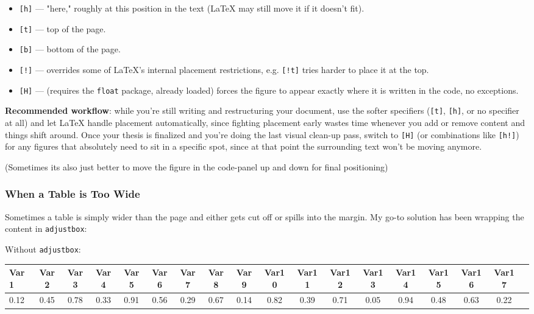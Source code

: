 \begin{itemize}
    \item \texttt{[h]} --- "here," roughly at this position in the text (LaTeX may still move it if it doesn't fit).
    \item \texttt{[t]} --- top of the page.
    \item \texttt{[b]} --- bottom of the page.
    \item \texttt{[!]} --- overrides some of LaTeX's internal placement restrictions, e.g. \texttt{[!t]} tries harder to place it at the top.
    \item \texttt{[H]} --- (requires the \texttt{float} package, already loaded) forces the figure to appear exactly where it is written in the code, no exceptions.
\end{itemize}

\textbf{Recommended workflow}: while you're still writing and restructuring your document, use the softer specifiers (\texttt{[t]}, \texttt{[h]}, or no specifier at all) and let LaTeX handle placement automatically, since fighting placement early wastes time whenever you add or remove content and things shift around. Once your thesis is finalized and you're doing the last visual clean-up pass, switch to \texttt{[H]} (or combinations like \texttt{[h!]}) for any figures that absolutely need to sit in a specific spot, since at that point the surrounding text won't be moving anymore.

(Sometimes its also just better to move the figure in the code-panel up and down for final positioning)

\subsubsection*{When a Table is Too Wide}
Sometimes a table is simply wider than the page and either gets cut off or spills into the margin. My go-to solution has been wrapping the content in \texttt{adjustbox}:

Without \texttt{adjustbox}: 

\begin{table}[H]
\centering
\begin{tabular}{lccccccccccccccccc}
    \toprule
    Var1 & Var2 & Var3 & Var4 & Var5 & Var6 & Var7 & Var8 & Var9 & Var10 & Var11 & Var12 & Var13 & Var14 & Var15 & Var16 & Var17 \\
    \midrule
    0.12 & 0.45 & 0.78 & 0.33 & 0.91 & 0.56 & 0.29 & 0.67 & 0.14 & 0.82 & 0.39 & 0.71 & 0.05 & 0.94 & 0.48 & 0.63 & 0.22 \\
    \bottomrule
\end{tabular}
\end{table}

